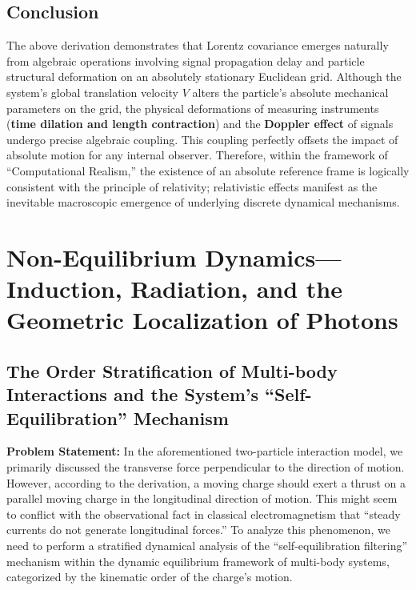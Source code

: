 \documentclass[12pt, a4paper]{article}
\begin{document}
\subsection{Conclusion}

The above derivation demonstrates that Lorentz covariance emerges naturally from algebraic operations involving signal propagation delay and particle structural deformation on an absolutely stationary Euclidean grid. Although the system's global translation velocity $V$ alters the particle's absolute mechanical parameters on the grid, the physical deformations of measuring instruments (\textbf{time dilation and length contraction}) and the \textbf{Doppler effect} of signals undergo precise algebraic coupling. This coupling perfectly offsets the impact of absolute motion for any internal observer. Therefore, within the framework of ``Computational Realism,'' the existence of an absolute reference frame is logically consistent with the principle of relativity; relativistic effects manifest as the inevitable macroscopic emergence of underlying discrete dynamical mechanisms.




\section{Non-Equilibrium Dynamics—Induction, Radiation, and the Geometric Localization of Photons}

\subsection{The Order Stratification of Multi-body Interactions and the System's ``Self-Equilibration'' Mechanism}

\textbf{Problem Statement:} In the aforementioned two-particle interaction model, we primarily discussed the transverse force perpendicular to the direction of motion. However, according to the derivation, a moving charge should exert a thrust on a parallel moving charge in the longitudinal direction of motion. This might seem to conflict with the observational fact in classical electromagnetism that ``steady currents do not generate longitudinal forces.'' To analyze this phenomenon, we need to perform a stratified dynamical analysis of the ``self-equilibration filtering'' mechanism within the dynamic equilibrium framework of multi-body systems, categorized by the kinematic order of the charge's motion.
\end{document}
